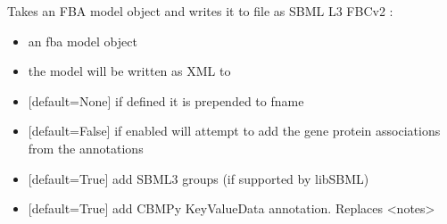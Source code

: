 \documentclass[letterpaper,10pt,english]{sphinxmanual}
\begin{document}
\begin{fulllineitems}
\label{\detokenize{modules_doc:cbmpy.CBWrite.writeSBML3FBCV2}}
\pysigstartsignatures
{}
\pysigstopsignatures
\sphinxAtStartPar
Takes an FBA model object and writes it to file as SBML L3 FBCv2 :
\begin{itemize}
\item {} 
\sphinxAtStartPar
{} an fba model object

\item {} 
\sphinxAtStartPar
{} the model will be written as XML to 

\item {} 
\sphinxAtStartPar
{} {[}default=None{]} if defined it is prepended to fname

\item {} 
\sphinxAtStartPar
{} {[}default=False{]} if enabled will attempt to add the gene protein associations from the annotations

\item {} 
\sphinxAtStartPar
{} {[}default=True{]} add SBML3 groups (if supported by libSBML)

\item {} 
\sphinxAtStartPar
{} {[}default=True{]} add CBMPy KeyValueData annotation. Replaces \textless{}notes\textgreater{}


\end{itemize}
\end{fulllineitems}
\end{document}
